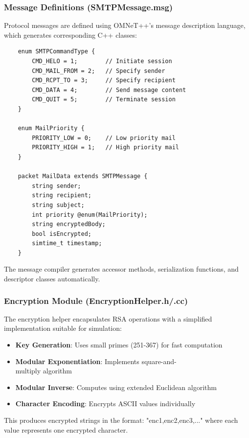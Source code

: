 \documentclass[12pt]{article}
\begin{document}
	\subsubsection{Message Definitions (SMTPMessage.msg)}
	
	Protocol messages are defined using OMNeT++'s message description language, which generates corresponding C++ classes:
	
	\begin{verbatim}
	enum SMTPCommandType {
	    CMD_HELO = 1;        // Initiate session
	    CMD_MAIL_FROM = 2;   // Specify sender
	    CMD_RCPT_TO = 3;     // Specify recipient
	    CMD_DATA = 4;        // Send message content
	    CMD_QUIT = 5;        // Terminate session
	}
	
	enum MailPriority {
	    PRIORITY_LOW = 0;    // Low priority mail
	    PRIORITY_HIGH = 1;   // High priority mail
	}
	
	packet MailData extends SMTPMessage {
	    string sender;
	    string recipient;
	    string subject;
	    int priority @enum(MailPriority);
	    string encryptedBody;
	    bool isEncrypted;
	    simtime_t timestamp;
	}
	\end{verbatim}
	
	The message compiler generates accessor methods, serialization functions, and descriptor classes automatically.
	
	\subsubsection{Encryption Module (EncryptionHelper.h/.cc)}
	
	The encryption helper encapsulates RSA operations with a simplified implementation suitable for simulation:
	
	\begin{itemize}
		\item \textbf{Key Generation}: Uses small primes (251-367) for fast computation
		\item \textbf{Modular Exponentiation}: Implements square-and-\\multiply algorithm
		\item \textbf{Modular Inverse}: Computes using extended Euclidean algorithm
		\item \textbf{Character Encoding}: Encrypts ASCII values individually
	\end{itemize}
	
	This produces encrypted strings in the format: "enc1,enc2,enc3,..." where each value represents one encrypted character.
	
\end{document}
